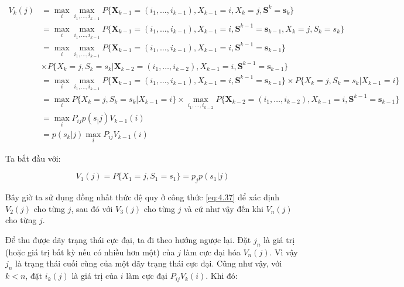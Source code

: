 \documentclass[14pt, a4paper]{article}
\numberwithin{equation}{section}
\numberwithin{figure}{section}
\theoremstyle{sltheorem}
\theoremstyle{soltheorem}
\numberwithin{dl}{section}
\numberwithin{md}{section}
\numberwithin{vd}{section}
\begin{document}
    \begin{equation} \label{eq:4.37}
        \begin{aligned}
            V_k (j) &= \max_i \max_{i_1, \dots, i_{k-1}} P \lbrace \mathbf{X}_{k-1} = (i_1, \dots, i_{k-1}), X_{k-1} = i, X_k = j, \mathbf{S}^k = \mathbf{s}_k \rbrace \\
            &= \max_i \max_{i_1, \dots, i_{k-1}} P \lbrace \mathbf{X}_{k-1} = (i_1, \dots, i_{k-1}), X_{k-1} = i, \mathbf{S}^{k-1} = \mathbf{s}_{k-1}, X_k = j, S_k = s_k \rbrace \\
            &= \max_i \max_{i_1, \dots, i_{k-1}} P \lbrace \mathbf{X}_{k-1} = (i_1, \dots, i_{k-1}), X_{k-1} = i, \mathbf{S}^{k-1} = \mathbf{s}_{k-1} \rbrace \\ &\times P \lbrace X_k = j, S_k = s_k \vert \mathbf{X}_{k-2} = (i_1, \dots, i_{k-2}), X_{k-1} = i, \mathbf{S}^{k-1}=\mathbf{s}_{k-1} \rbrace \\
            &= \max_i \max_{i_1, \dots, i_{k-1}} P \lbrace \mathbf{X}_{k-1} = (i_1, \dots, i_{k-1}), X_{k-1} = i, \mathbf{S}^{k-1} = \mathbf{s}_{k-1} \rbrace \times P \lbrace X_k = j, S_k = s_k \vert X_{k-1}=i \rbrace \\
            &= \max_i P \lbrace X_k = j, S_k = s_k \vert X_{k-1} = i \rbrace \times \max_{i_1, \dots, i_{k-2}} P \lbrace \mathbf{X}_{k-2} = (i_1, \dots, i_{k-2}), X_{k-1}=i, \mathbf{S}^{k-1}=\mathbf{s}_{k-1} \rbrace \\
            &= \max_i P_{ij} p(s_ \vert j) V_{k-1}(i) \\
            &= p(s_k \vert j) \max_i P_{ij} V_{k-1}(i)
        \end{aligned}
    \end{equation}

    Ta bắt đầu với:

    \begin{equation*}
        V_1(j) = P \lbrace X_1 = j, S_1 = s_1 \rbrace = p_j p(s_1 \vert j)
    \end{equation*}

    Bây giờ ta sử dụng đồng nhất thức đệ quy ở công thức \ref{eq:4.37} để xác định $V_2(j)$ cho từng $j$, sau đó với $V_3 (j)$ cho từng $j$ và cứ như vậy đến khi $V_n(j)$ cho từng $j$.

    Để thu được dãy trạng thái cực đại, ta đi theo hướng ngược lại.
    Đặt $j_n$ là giá trị (hoặc giá trị bất kỳ nếu có nhiều hơn một) của $j$ làm cực đại hóa $V_n(j)$.
    Vì vậy $j_n$ là trạng thái cuối cùng của một dãy trạng thái cực đại.
    Cũng như vậy, với $k < n$, đặt $i_k(j)$ là giá trị của $i$ làm cực đại $P_{ij}V_k(i)$.
    Khi đó:
\end{document}

